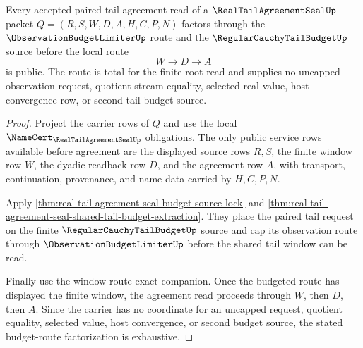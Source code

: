 \begin{theorem}
\label{thm:real-tail-agreement-seal-root-budget-route-totality}
Every accepted paired tail-agreement read of a $\RealTailAgreementSealUp$ packet $Q=(R,S,W,D,A,H,C,P,N)$ factors through the $\ObservationBudgetLimiterUp$ route and the $\RegularCauchyTailBudgetUp$ source before the local route
$$
W \to D \to A
$$
is public. The route is total for the finite root read and supplies no uncapped observation request, quotient stream equality, selected real value, host convergence row, or second tail-budget source.
\end{theorem}
\begin{proof}
Project the carrier rows of $Q$ and use the local $\NameCert_{\RealTailAgreementSealUp}$ obligations. The only public service rows available before agreement are the displayed source rows $R,S$, the finite window row $W$, the dyadic readback row $D$, and the agreement row $A$, with transport, continuation, provenance, and name data carried by $H,C,P,N$.

Apply \autoref{thm:real-tail-agreement-seal-budget-source-lock} and \autoref{thm:real-tail-agreement-seal-shared-tail-budget-extraction}. They place the paired tail request on the finite $\RegularCauchyTailBudgetUp$ source and cap its observation route through $\ObservationBudgetLimiterUp$ before the shared tail window can be read.

Finally use the window-route exact companion. Once the budgeted route has displayed the finite window, the agreement read proceeds through $W$, then $D$, then $A$. Since the carrier has no coordinate for an uncapped request, quotient equality, selected value, host convergence, or second budget source, the stated budget-route factorization is exhaustive.
\end{proof}

